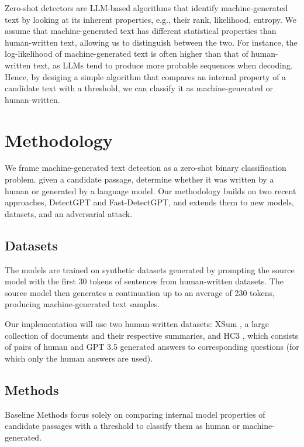 \documentclass[11pt]{article}
\begin{document}
Zero-shot detectors are LLM-based algorithms that identify machine-generated text by looking at its inherent properties, e.g., their rank, likelihood, entropy. We assume that machine-generated text has different statistical properties than human-written text, allowing us to distinguish between the two. For instance, the log-likelihood of machine-generated text is often higher than that of human-written text, as LLMs tend to produce more probable sequences when decoding. Hence, by desiging a simple algorithm that compares an internal property of a candidate text with a threshold, we can classify it as machine-generated or human-written.


\section{Methodology}

We frame machine-generated text detection as a zero-shot binary classification problem. given a candidate passage, determine whether it was written by a human or generated by a language model. Our methodology builds on two recent approaches, DetectGPT and Fast-DetectGPT, and extends them to new models, datasets, and an adversarial attack.

\subsection{Datasets}

The models are trained on synthetic datasets generated by prompting the source model with the first 30 tokens of sentences from human-written datasets. The source model then generates a continuation up to an average of 230 tokens, producing machine-generated text samples.

Our implementation will use two human-written datasets: XSum \cite{XSum}, a large collection of documents and their respective summaries, and HC3 \cite{HC3}, which consists of pairs of human and GPT 3.5 generated answers to corresponding questions (for which only the human answers are used).



\subsection{Methods}

Baseline Methods focus solely on comparing internal model properties of candidate passages with a threshold to classify them as human or machine-generated.
\end{document}
